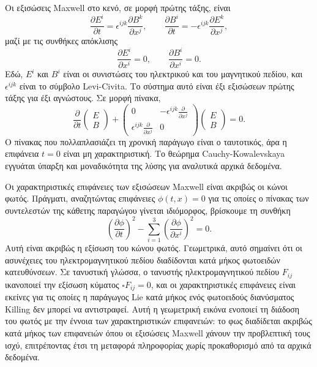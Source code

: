 \documentclass[12pt]{article}
\begin{document}
Οι εξισώσεις Maxwell στο κενό, σε μορφή πρώτης τάξης, είναι
\begin{equation}
\frac{\partial E^i}{\partial t} = \epsilon^{ijk} \frac{\partial B^k}{\partial x^j}, \qquad \frac{\partial B^i}{\partial t} = -\epsilon^{ijk} \frac{\partial E^k}{\partial x^j},
\end{equation}
μαζί με τις συνθήκες απόκλισης
\begin{equation}
\frac{\partial E^i}{\partial x^i} = 0, \qquad \frac{\partial B^i}{\partial x^i} = 0.
\end{equation}
Εδώ, $E^i$ και $B^i$ είναι οι συνιστώσες του ηλεκτρικού και του μαγνητικού πεδίου, και $\epsilon^{ijk}$ είναι το σύμβολο Levi-Civita. Το σύστημα αυτό είναι έξι εξισώσεων πρώτης τάξης για έξι αγνώστους. Σε μορφή πίνακα,
\begin{equation}
\frac{\partial}{\partial t} \begin{pmatrix} E \\ B \end{pmatrix} + \begin{pmatrix} 0 & -\epsilon^{ijk} \frac{\partial}{\partial x^j} \\ \epsilon^{ijk} \frac{\partial}{\partial x^j} & 0 \end{pmatrix} \begin{pmatrix} E \\ B \end{pmatrix} = 0.
\end{equation}
Ο πίνακας που πολλαπλασιάζει τη χρονική παράγωγο είναι ο ταυτοτικός, άρα η επιφάνεια $t = 0$ είναι μη χαρακτηριστική. Το θεώρημα Cauchy-Kowalevskaya εγγυάται ύπαρξη και μοναδικότητα της λύσης για αναλυτικά αρχικά δεδομένα.

Οι χαρακτηριστικές επιφάνειες των εξισώσεων Maxwell είναι ακριβώς οι κώνοι φωτός. Πράγματι, αναζητώντας επιφάνειες $\phi(t, x) = 0$ για τις οποίες ο πίνακας των συντελεστών της κάθετης παραγώγου γίνεται ιδιόμορφος, βρίσκουμε τη συνθήκη
\begin{equation}
\left( \frac{\partial \phi}{\partial t} \right)^2 - \sum_{i=1}^3 \left( \frac{\partial \phi}{\partial x^i} \right)^2 = 0.
\end{equation}
Αυτή είναι ακριβώς η εξίσωση του κώνου φωτός. Γεωμετρικά, αυτό σημαίνει ότι οι ασυνέχειες του ηλεκτρομαγνητικού πεδίου διαδίδονται κατά μήκος φωτοειδών κατευθύνσεων. Σε τανυστική γλώσσα, ο τανυστής ηλεκτρομαγνητικού πεδίου $F_{ij}$ ικανοποιεί την εξίσωση κύματος $\square F_{ij} = 0$, και οι χαρακτηριστικές επιφάνειες είναι εκείνες για τις οποίες η παράγωγος Lie κατά μήκος ενός φωτοειδούς διανύσματος Killing δεν μπορεί να αντιστραφεί. Αυτή η γεωμετρική εικόνα ενοποιεί τη διάδοση του φωτός με την έννοια των χαρακτηριστικών επιφανειών: το φως διαδίδεται ακριβώς κατά μήκος των επιφανειών όπου οι εξισώσεις Maxwell χάνουν την προβλεπτική τους ισχύ, επιτρέποντας έτσι τη μεταφορά πληροφορίας χωρίς προκαθορισμό από τα αρχικά δεδομένα.
\end{document}

